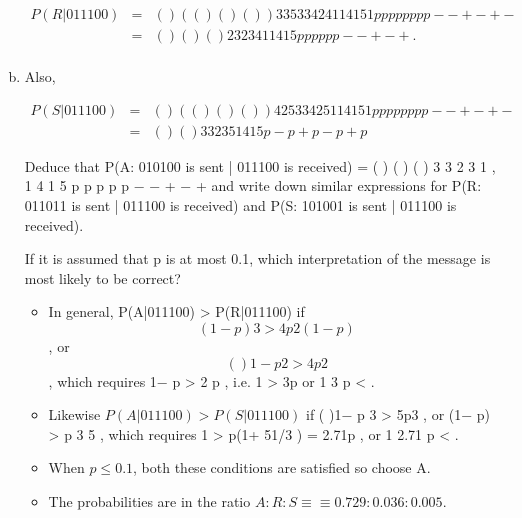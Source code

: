 \documentclass[a4paper,12pt]{article}
\begin{document}
\begin{enumerate}[(a)]
\begin{eqnarray*}
P(R|011100) &=& ( )
( ( ) ( ) ( ) )
3 3
5 3 3 4 2
4 1
1 4 1 5 1
p p
p p p p p p
−
− + − + −
\\ &=& ( )
( ) ( )
2
3 2 3
4 1
1 4 1 5
p p
p p p p
−
− + − +
.\\
\end{eqnarray*}
\item Also, 

\begin{eqnarray*}
P(S|011100) &=& ( )
( ( ) ( ) ( ) )
4 2
5 3 3 4 2
5 1
1 4 1 5 1
p p
p p p p p p
−
− + − + −
\\&=&
( ) ( )
3
3 2 3
5
1 4 1 5
p
− p + p − p + p
\end{eqnarray*}
\begin{framed}
Deduce that
P(A: 010100 is sent | 011100 is received) = ( )
( ) ( )
3
3 2 3
1
,
1 4 1 5
p
p p p p
−
− + − +
and write down similar expressions for
P(R: 011011 is sent | 011100 is received)
and
P(S: 101001 is sent | 011100 is received).

If it is assumed that p is at most 0.1, which interpretation of the message is most
likely to be correct?

\end{framed}

\begin{itemize}
As p → 0, P(A|011100) → 1, while the others do not.
\item In general, P(A|011100) > P(R|011100) if \[(1− p)3 > 4 p2 (1− p) \], or 
\[( )1− p 2 > 4 p2\] ,
which requires 1− p > 2 p , i.e. 1 > 3p or 1
3 p < .
\item Likewise $P(A|011100) > P(S|011100)$ if ( )1− p 3 > 5p3 , or (1− p) > p 3 5 , which
requires 1 > p(1+ 51/3 ) = 2.71p , or 1
2.71
p < .
\item When $p \leq 0.1$, both these conditions are satisfied so choose A.
\item The probabilities are in the ratio $A:R:S \equiv≡ 0.729 : 0.036 : 0.005.$
\end{itemize}
\end{enumerate}
\end{document}
